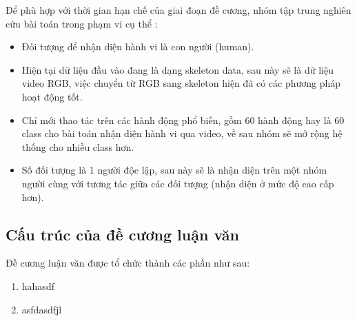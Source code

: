 Để phù hợp với thời gian  hạn chế của giai đoạn đề cương, nhóm tập trung nghiên cứu bài toán trong phạm vi cụ thể :
\begin{itemize}
    \item Đối tượng để nhận diện hành vi là con người (human).
    \item Hiện tại dữ liệu đầu vào đang là dạng skeleton data, sau này sẽ là dữ liệu video RGB, việc chuyển từ RGB sang skeleton hiện
          đã có các phương pháp hoạt động tốt.
    \item Chỉ mới thao tác trên các hành động phổ biến, gồm 60 hành động hay là 60 class cho bài toán nhận diện hành vi qua video, về sau nhóm sẽ mở rộng
          hệ thống cho nhiều class hơn.
    \item Số đối tượng là 1 người độc lập, sau này sẽ là nhận diện trên một nhóm người cùng với tương tác giữa các đối tượng (nhận diện ở mức độ cao cấp hơn).
\end{itemize}

\subsection{Cấu trúc của đề cương luận văn}
Đề cương luận văn được tổ chức thành các  phần như sau:


\begin{enumerate}[Chương \{enumii}]
    \item  hahasdf
    \item asfdasdfjl

\end{enumerate}

